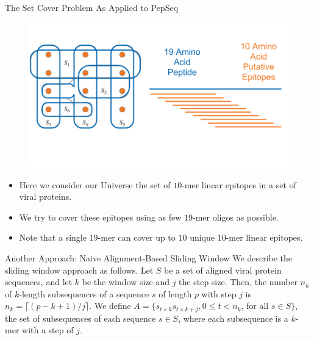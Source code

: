\documentclass[final]{beamer}
\newlength{\colwidth}
\begin{document}
\begin{frame}[t]
\begin{columns}[t]
\begin{column}{\colwidth}
\begin{block}{The Set Cover Problem As Applied to PepSeq}
    \begin{figure}
      \includegraphics[width=0.7\colwidth]{figures/set_cover_oligo.png}
      \label{fig:library}
    \end{figure}
    \begin{itemize}
      \item Here we consider our Universe the set of $10$-mer linear epitopes in a set of viral proteins.
      \item We try to cover these epitopes using as few $19$-mer oligos as possible.
      \item Note that a single $19$-mer can cover up to $10$ unique $10$-mer linear epitopes.
    \end{itemize}


\end{block}

\begin{block}{Another Approach: Naive Alignment-Based Sliding Window}
  We describe the sliding window approach as follows.
  Let $S$ be a set of aligned viral protein sequences, and let $k$ be the window size and $j$ the step size.
  Then, the number $n_k$ of $k$-length subsequences of a sequence $s$ of length $p$ with step $j$ is $n_k = \lceil(p - k + 1 )/j\rceil$.
  We define $A = \{ s_{t\times k }s_{t\times k + j}, 0 \leq t < n_k$, for all $s \in S \}$, the set of subsequences of each sequence
  $s\in S$, where each subsequence is a $k$-mer with a step of $j$.


\end{block}
\end{column}
\end{columns}
\end{frame}
\end{document}
